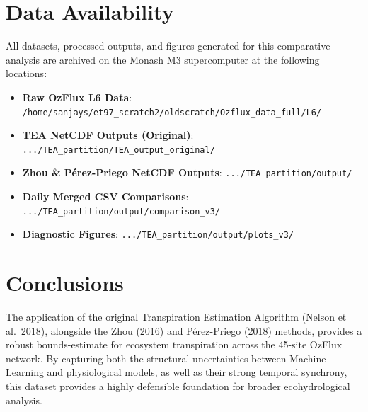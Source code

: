 \documentclass[11pt,a4paper]{article}
\begin{document}
\section{Data Availability}
All datasets, processed outputs, and figures generated for this comparative analysis are archived on the Monash M3 supercomputer at the following locations:
\begin{itemize}
    \item \textbf{Raw OzFlux L6 Data}: \texttt{/home/sanjays/et97\_scratch2/oldscratch/Ozflux\_data\_full/L6/}
    \item \textbf{TEA NetCDF Outputs (Original)}: \texttt{.../TEA\_partition/TEA\_output\_original/}
    \item \textbf{Zhou \& P\'erez-Priego NetCDF Outputs}: \texttt{.../TEA\_partition/output/}
    \item \textbf{Daily Merged CSV Comparisons}: \texttt{.../TEA\_partition/output/comparison\_v3/}
    \item \textbf{Diagnostic Figures}: \texttt{.../TEA\_partition/output/plots\_v3/}
\end{itemize}

\section{Conclusions}
The application of the original Transpiration Estimation Algorithm (Nelson et al.\ 2018), alongside the Zhou (2016) and P\'erez-Priego (2018) methods, provides a robust bounds-estimate for ecosystem transpiration across the 45-site OzFlux network. By capturing both the structural uncertainties between Machine Learning and physiological models, as well as their strong temporal synchrony, this dataset provides a highly defensible foundation for broader ecohydrological analysis.
\end{document}
